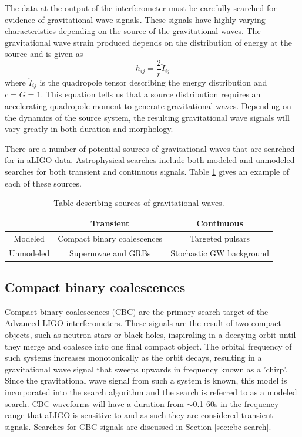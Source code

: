 The data at the output of the interferometer must be carefully searched 
for evidence of gravitational wave signals. These signals have highly 
varying characteristics depending on the source of the gravitational 
waves. The gravitational wave strain produced depends on the distribution 
of energy at the source and is given as
\begin{equation}
h_{ij} = \frac{2}{r}\ddot{I}_{ij}
\end{equation}
where $\ddot{I}_{ij}$ is the quadropole tensor describing the 
energy distribution and $c=G=1$. This equation tells us that 
a source distribution requires an accelerating quadropole moment to 
generate gravitational waves. Depending on the dynamics of the source 
system, the resulting gravitational wave signals will vary greatly in 
both duration and morphology.

There are a number of potential sources of gravitational waves that are 
searched for in aLIGO data. Astrophysical searches include both modeled and unmodeled 
searches for both transient and continuous signals. Table \ref{tab:sources} 
gives an example of each of these sources.

\begin{table}[!ht]%
  \begin{tabular}{|c|c|c|}
  \hline
    & Transient  & Continuous  \\
  \hline
  Modeled & Compact binary coalescences & Targeted pulsars  \\
  \hline
  Unmodeled & Supernovae and GRBs  & Stochastic GW background \\
  \hline
  \end{tabular}
  \caption[Table of GW sources]{Table describing sources of %
           gravitational waves.}
  \label{tab:sources}
\end{table}

\subsection{Compact binary coalescences}

Compact binary coalescences (CBC) are the primary search target of the 
Advanced LIGO interferometers. These signals are the result of two 
compact objects, such as neutron stars or black holes, inspiraling 
in a decaying orbit until they merge and coalesce into one final 
compact object. The orbital frequency of such systems increases 
monotonically as the orbit decays, resulting in a gravitational 
wave signal that sweeps upwards in frequency known as a 'chirp'. 
Since the gravitational wave signal from such a system is known, 
this model is incorporated into the search algorithm and the 
search is referred to as a modeled search. CBC waveforms will 
have a duration from $\sim$0.1-60s in the frequency range that
aLIGO is sensitive to and as such they are considered transient 
signals. Searches for CBC 
signals are discussed in Section \ref{sec:cbc-search}.

